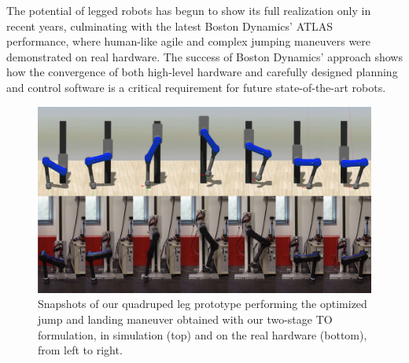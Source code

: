 The potential of legged robots has begun to show its full realization only in recent years, culminating with the latest Boston Dynamics' ATLAS~\cite{agile_bots::atlas_gets_grip} performance, where human-like agile and complex jumping maneuvers were demonstrated on real hardware. The success of Boston Dynamics' approach shows how the convergence of both high-level hardware and carefully designed planning and control software is a critical requirement for future state-of-the-art robots. 
\begin{figure}[t]
    \centering
    \includegraphics[width=0.98\columnwidth]{images/jumping_sequence_real_sim_compressed.pdf}
    \caption{Snapshots of our quadruped leg prototype performing the optimized jump and landing maneuver obtained with our two-stage TO formulation, in simulation (top) and on the real hardware (bottom), from left to right.\vspace{-0.3cm}}
    \label{fig:jumping_sequence}
\end{figure}


